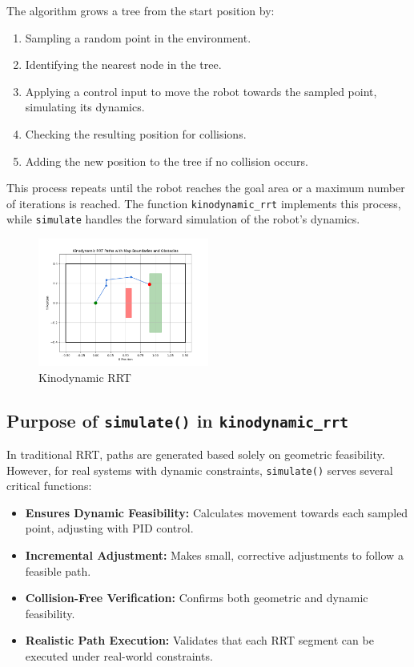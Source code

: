 \documentclass[12pt]{article}
\begin{document}
The algorithm grows a tree from the start position by:
\begin{enumerate}
    \item Sampling a random point in the environment.
    \item Identifying the nearest node in the tree.
    \item Applying a control input to move the robot towards the sampled point, simulating its dynamics.
    \item Checking the resulting position for collisions.
    \item Adding the new position to the tree if no collision occurs.
\end{enumerate}

This process repeats until the robot reaches the goal area or a maximum number of iterations is reached. The function \texttt{kinodynamic\_rrt} implements this process, while \texttt{simulate} handles the forward simulation of the robot’s dynamics.
    
\begin{figure}[h]
    \centering
    \includegraphics[width=0.5\textwidth]{./images/path.png}
    \caption{Kinodynamic RRT}
    \label{fig:sample_image}
\end{figure}

\subsection{Purpose of \texttt{simulate()} in \texttt{kinodynamic\_rrt}}
In traditional RRT, paths are generated based solely on geometric feasibility. However, for real systems with dynamic constraints, \texttt{simulate()} serves several critical functions:
\begin{itemize}
    \item \textbf{Ensures Dynamic Feasibility:} Calculates movement towards each sampled point, adjusting with PID control.
    \item \textbf{Incremental Adjustment:} Makes small, corrective adjustments to follow a feasible path.
    \item \textbf{Collision-Free Verification:} Confirms both geometric and dynamic feasibility.
    \item \textbf{Realistic Path Execution:} Validates that each RRT segment can be executed under real-world constraints.
\end{itemize}
    
\end{document}
